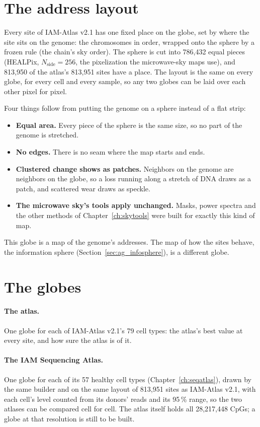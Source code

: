 \section{The address layout}

Every site of IAM-Atlas v2.1 has one fixed place on the globe, set by where the site sits on the genome: the chromosomes in order,
wrapped onto the sphere by a frozen rule (the chain's sky order). The sphere is cut into 786{,}432 equal pieces (HEALPix,
$N_\mathrm{side}=256$, the pixelization the microwave-sky maps use), and 813{,}950 of the atlas's 813{,}951 sites have a place. The
layout is the same on every globe, for every cell and every sample, so any two globes can be laid over each other pixel for pixel.

Four things follow from putting the genome on a sphere instead of a flat strip:
\begin{itemize}
\item \textbf{Equal area.} Every piece of the sphere is the same size, so no part of the genome is stretched.
\item \textbf{No edges.} There is no seam where the map starts and ends.
\item \textbf{Clustered change shows as patches.} Neighbors on the genome are neighbors on the globe, so a loss running along a
stretch of DNA draws as a patch, and scattered wear draws as speckle.
\item \textbf{The microwave sky's tools apply unchanged.} Masks, power spectra and the other methods of Chapter~\ref{ch:skytools} were
built for exactly this kind of map.
\end{itemize}
This globe is a map of the genome's addresses. The map of how the sites behave, the information sphere
(Section~\ref{sec:ag_infosphere}), is a different globe.

\section{The globes}

\paragraph{The atlas.} One globe for each of IAM-Atlas v2.1's 79 cell types: the atlas's best value at every site, and how sure
the atlas is of it.

\paragraph{The IAM Sequencing Atlas.} One globe for each of its 57 healthy cell types (Chapter~\ref{ch:seqatlas}), drawn by the same
builder and on the same layout of 813{,}951 sites as IAM-Atlas v2.1, with each cell's level counted from its donors' reads and its 95\,\% range,
so the two atlases can be compared cell for cell. The atlas itself holds all 28{,}217{,}448 CpGs; a globe at that resolution is still to be built.

